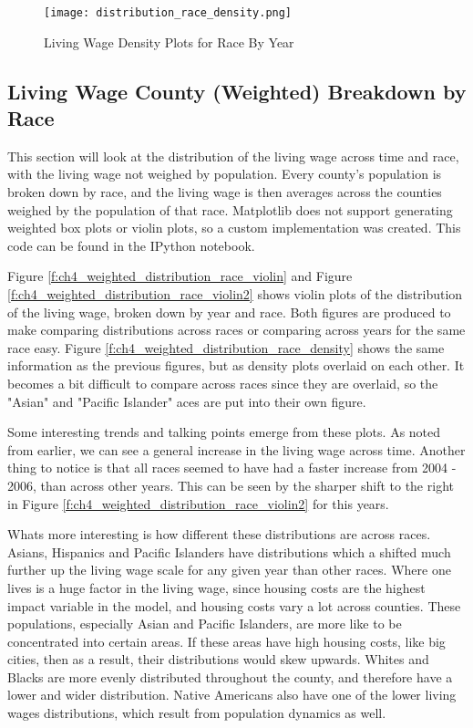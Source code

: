 \begin{figure}[H]
    \centering
        \texttt{[image: distribution\_race\_density.png]}
        \caption{Living Wage Density Plots for Race By Year}
    \label{f:ch4_distribution_race_density}
\end{figure}




\subsection{Living Wage County (Weighted) Breakdown by Race}

This section will look at the distribution of the living wage across time and race, with the living wage not weighed by population. Every county's population is broken down by race, and the living wage is then averages across the counties weighed by the population of that race. Matplotlib does not support generating weighted box plots or violin plots, so a custom implementation was created. This code can be found in the IPython notebook.

Figure \ref{f:ch4_weighted_distribution_race_violin} and Figure \ref{f:ch4_weighted_distribution_race_violin2} shows violin plots of the distribution of the living wage, broken down by year and race. Both figures are produced to make comparing distributions across races or comparing across years for the same race easy. Figure \ref{f:ch4_weighted_distribution_race_density} shows the same information as the previous  figures, but as density plots overlaid on each other. It becomes a bit difficult to compare across races since they are overlaid, so the "Asian" and "Pacific Islander" aces are put into their own figure.

Some interesting trends and talking points emerge from these plots. As noted from earlier, we can see a general increase in the living wage across time. Another thing to notice is that all races seemed to have had a faster increase from 2004 - 2006, than across other years. This can be seen by the sharper shift to the right in Figure \ref{f:ch4_weighted_distribution_race_violin2} for this years. 

Whats more interesting is how different these distributions are across races. Asians, Hispanics and Pacific Islanders have distributions which a shifted much further up the living wage scale for any given year than other races. Where one lives is a huge factor in the living wage, since housing costs are the highest impact variable in the model, and housing costs vary a lot across counties. These populations, especially Asian and Pacific Islanders, are more like to be concentrated into certain areas. If these areas have high housing costs, like big cities, then as a result, their distributions would skew upwards. Whites and Blacks are more evenly distributed throughout the county, and therefore have a lower and wider distribution. Native Americans also have one of the lower living wages distributions, which result from population dynamics as well.

